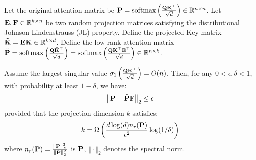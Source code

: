 \documentclass[aspectratio=169]{beamer}
\begin{document}
\begin{frame}
	\begin{theorem} \label{thm:linformer}
		Let the original attention matrix be $\mathbf{P} = \mathrm{softmax}\left(\frac{\mathbf{Q}\mathbf{K}^\top}{\sqrt{d}}\right) \in \mathbb{R}^{n \times n}$.
		Let $\mathbf{E}, \mathbf{F} \in \mathbb{R}^{k \times n}$ be two random projection matrices satisfying the distributional Johnson-Lindenstrauss (JL) property.
		Define the projected Key matrix $\tilde{\mathbf{K}} = \mathbf{E}\mathbf{K} \in \mathbb{R}^{k \times d}$.
		Define the low-rank attention matrix $\tilde{\mathbf{P}} = \mathrm{softmax}\left(\frac{\mathbf{Q}\tilde{\mathbf{K}}^\top}{\sqrt{d}}\right) = \mathrm{softmax}\left(\frac{\mathbf{Q}\mathbf{K}^\top \mathbf{E}^\top}{\sqrt{d}}\right) \in \mathbb{R}^{n \times k}$.

		Assume the largest singular value
		$\sigma_1\left(\frac{\mathbf{Q}\mathbf{K}^\top}{\sqrt{d}}\right) = O(n)$. Then,
		for any $0 < \epsilon, \delta < 1$, with probability at least $1 - \delta$,
		we have: $$ \left\Vert \mathbf{P} - \tilde{\mathbf{P}}\mathbf{F} \right\Vert_2
		\le \epsilon $$ provided that the projection dimension $k$ satisfies: $$ k
		= \Omega\left( \frac{d \log(d) n_r(\mathbf{P})}{\epsilon^2} \log(1/\delta)
		\right) $$ where $n_r(\mathbf{P}) = \frac{\Vert \mathbf{P} \Vert_F^2}{\Vert
		\mathbf{P} \Vert_2^2}$ is $\mathbf{P}$, $\Vert \cdot \Vert_2$ denotes the
		spectral norm.
	\end{theorem}
\end{frame}
\newcommand{\vect}[1]{\mathbf{#1}} %
\newcommand{\calE}{\mathcal{E}}
\newcommand{\calN}{\mathcal{N}}
\end{document}
